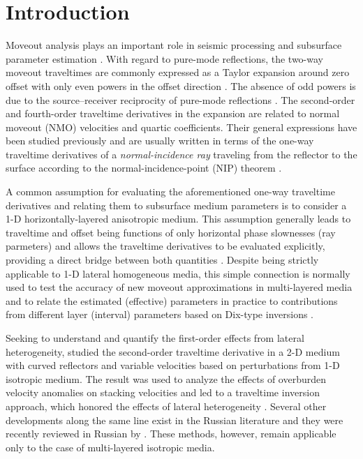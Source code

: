 \section{Introduction}
Moveout analysis plays an important role in seismic processing and subsurface parameter estimation \cite[]{yilmaz}. With regard to pure-mode reflections, the two-way moveout traveltimes are commonly expressed as a Taylor expansion around zero offset with only even powers in the offset direction \cite[]{taner}. The absence of odd powers is due to the source–receiver reciprocity
of pure-mode reflections \cite[]{pech2003,tsvankinbook}. The second-order and fourth-order traveltime derivatives in the expansion are related to normal moveout (NMO) velocities and quartic coefficients. Their general expressions have been studied previously \cite[]{fomelnip,pech2003,pech2004} and are usually written in terms of the one-way traveltime derivatives of a \textit{normal-incidence ray} traveling from the reflector to the surface according to the normal-incidence-point (NIP) theorem \cite[]{krey,chernjakgritsenko,hubralkrey,hubral,gritsenko,fomelnonhyper}.

A common assumption for evaluating the aforementioned one-way traveltime derivatives and relating them to subsurface medium parameters is to consider a 1-D horizontally-layered anisotropic medium. This assumption generally leads to traveltime and offset being functions of only horizontal phase slownesses (ray parmeters) and allows the traveltime derivatives to be evaluated explicitly, providing a direct bridge between both quantities \cite[e.g,][]{zoneinterval,korenravvetriclinic}. Despite being strictly applicable to 1-D lateral homogeneous media, this simple connection is normally used to test the accuracy of new moveout approximations in multi-layered media and to relate the estimated (effective) parameters in practice to contributions from different layer (interval) parameters based on Dix-type inversions \cite[e.g,][]{constraineddix,ursin,fomelstovas,bayesiandix,tsvankinbook,thomsenbook}.

Seeking to understand and quantify the first-order effects from lateral heterogeneity, \cite{blias1981} studied the second-order traveltime derivative in a 2-D medium with curved reflectors and variable velocities based on perturbations from 1-D isotropic medium. The result was used to analyze the effects of overburden velocity anomalies on stacking velocities \cite[]{bliasgritsenko,blias2006,blias2009stacking} and led to a traveltime inversion approach, which honored the effects of lateral heterogeneity \cite[]{bliaskhat}. Several other developments along the same line exist in the Russian literature \cite[e.g,][]{bliasgrit1984,gritsenko2001} and they were recently reviewed in Russian by \cite{gritsenkobook}. These methods, however, remain applicable only to the case of multi-layered isotropic media.

